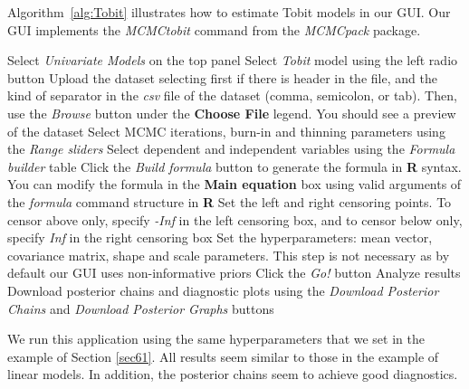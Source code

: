 Algorithm~\ref{alg:Tobit} illustrates how to estimate Tobit models in our GUI. Our GUI implements the \textit{MCMCtobit} command from the \textit{MCMCpack} package.

\begin{algorithm}[h!]
	\caption{Tobit models}\label{alg:Tobit}
	\begin{algorithmic}[1]  		 			
		\State Select \textit{Univariate Models} on the top panel
		\State Select \textit{Tobit} model using the left radio button
		\State Upload the dataset selecting first if there is header in the file, and the kind of separator in the \textit{csv} file of the dataset (comma, semicolon, or tab). Then, use the \textit{Browse} button under the \textbf{Choose File} legend. You should see a preview of the dataset
		\State Select MCMC iterations, burn-in and thinning parameters using the \textit{Range sliders}
		\State Select dependent and independent variables using the \textit{Formula builder} table
		\State Click the \textit{Build formula} button to generate the formula in \textbf{R} syntax. You can modify the formula in the \textbf{Main equation} box using valid arguments of the \textit{formula} command structure in \textbf{R}
		\State Set the left and right censoring points. To censor above only, specify \textit{-Inf} in the left censoring box, and to censor below only, specify \textit{Inf} in the right censoring box
		\State Set the hyperparameters: mean vector, covariance matrix, shape and scale parameters. This step is not necessary as by default our GUI uses non-informative priors
		\State Click the \textit{Go!} button
		\State Analyze results
		\State Download posterior chains and diagnostic plots using the \textit{Download Posterior Chains} and \textit{Download Posterior Graphs} buttons
	\end{algorithmic} 
\end{algorithm}

We run this application using the same hyperparameters that we set in the example of Section \ref{sec61}. All results seem similar to those in the example of linear models. In addition, the posterior chains seem to achieve good diagnostics.


